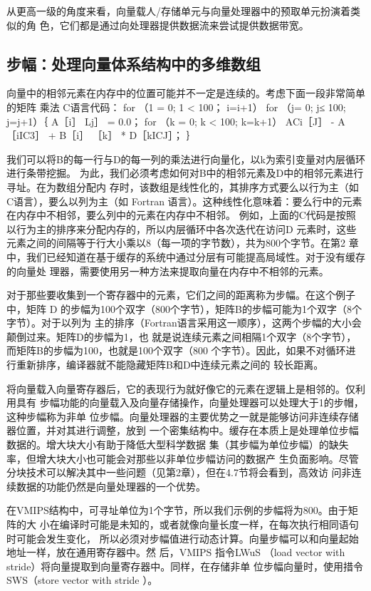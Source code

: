 从更高一级的角度来看，向量载人/存储单元与向量处理器中的预取单元扮演着类似的角
色，它们都是通过向处理器提供数据流来尝试提供数据带宽。

\subsection{步幅：处理向量体系结构中的多维数组}

向量中的相邻元素在内存中的位置可能并不一定是连续的。考虑下面一段非常简单的矩阵
乘法 C语言代码：
for （1 = 0; 1 < 100；
i=i+1）
for （j= 0; j≤ 100; j=j+1）｛
A［i］ Lj］ = 0.0；
for （k = 0; k < 100; k=k+1）
ACi［J］ - A［iIC3］ + B［i］ ［k］ * D［kICJ］；
｝

我们可以将B的每一行与D的每一列的乘法进行向量化，以k为索引变量对内层循环进行条带挖掘。
为此，我们必须考虑如何对B中的相邻元素及D中的相邻元素进行寻址。在为数组分配内
存时，该数组是线性化的，其排序方式要么以行为主（如C语言），要么以列为主（如 Fortran
语言）。这种线性化意味着：要么行中的元素在内存中不相邻，要么列中的元素在内存中不相邻。
例如，上面的C代码是按照以行为主的排序来分配内存的，所以内层循环中各次迭代在访问D
元素时，这些元素之间的间隔等于行大小乘以8（每一项的字节数），共为800个字节。在第2
章中，我们已经知道在基于缓存的系统中通过分层有可能提高局域性。对于没有缓存的向量处
理器，需要使用另一种方法来提取向量在内存中不相邻的元素。

对于那些要收集到一个寄存器中的元素，它们之间的距离称为步幅。在这个例子中，矩阵
D 的步幅为100个双字（800个字节），矩阵B的步幅可能为1个双字（8个字节）。对于以列为
主的排序（Fortran语言采用这一顺序），这两个步幅的大小会颠倒过来。矩阵D的步幅为1，也
就是说连续元素之间相隔1个双字（8个字节），而矩阵B的步幅为100，也就是100个双字（800
个字节）。因此，如果不对循环进行重新排序，编译器就不能隐藏矩阵B和D中连续元素之间的
较长距离。

将向量载入向量寄存器后，它的表现行为就好像它的元素在逻辑上是相邻的。仅利用具有
步幅功能的向量载入及向量存储操作，向量处理器可以处理大于1的步帽，这种步幅称为非单
位步幅。向量处理器的主要优势之一就是能够访问非连续存储器位置，并对其进行调整，放到
一个密集结构中。缓存在本质上是处理单位步幅数据的。增大块大小有助于降低大型科学数据
集（其步幅为单位步幅）的缺失率，但增大块大小也可能会对那些以非单位步幅访问的数据产
生负面影响。尽管分块技术可以解决其中一些问题（见第2章），但在4.7节将会看到，高效访
问非连续数据的功能仍然是向量处理器的一个优势。

在VMIPS结构中，可寻址单位为1个字节，所以我们示例的步幅将为800。由于矩阵的大
小在编译时可能是未知的，或者就像向量长度一样，在每次执行相同语句时可能会发生变化，
所以必须对步幅值进行动态计算。向量步幅可以和向量起始地址一样，放在通用寄存器中。然
后，VMIPS 指令LWuS （load vector with stride）将向量提取到向量寄存器中。同样，在存储非单
位步幅向量时，使用措令 SWS（store vector with stride ）。

